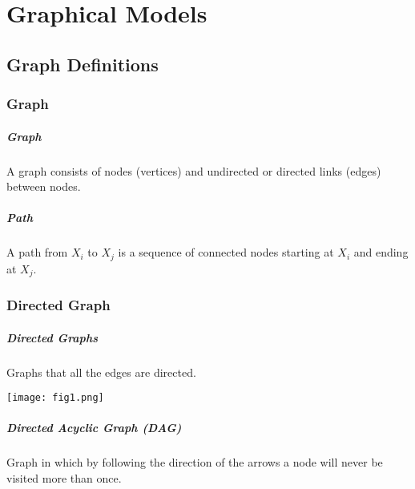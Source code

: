
\graphicspath{{Chapter12/Figs/}}

\chapter{Graphical Models}
\label{chapter12}



\section{Graph Definitions}
\label{section12.1}

\subsection{Graph}

\paragraph{Graph}

A graph consists of nodes (vertices) and undirected or directed links (edges) between nodes.

\paragraph{Path}

A path from $X_i$ to $X_j$ is a sequence of connected nodes starting at $X_i$ and ending at $X_j$.

\subsection{Directed Graph}

\paragraph{Directed Graphs}

Graphs that all the edges are directed.
\begin{figure*}[h]
	\centering
	\texttt{[image: fig1.png]}
\end{figure*}

\paragraph{Directed Acyclic Graph (DAG)}

Graph in which by following the direction of the arrows a node will never be visited more than once.

